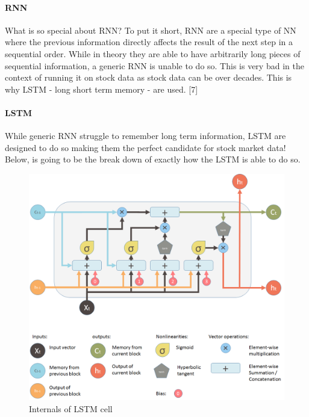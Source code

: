 \documentclass[12pt]{article}
\begin{document}
\paragraph{RNN}
What is so special about RNN? To put it short, RNN are a special type of NN where the previous information directly affects the result of the next step in a sequential order. While in theory they are able to have arbitrarily long pieces of sequential information, a generic RNN is unable to do so. This is very bad in the context of running it on stock data as stock data can be over decades. This is why LSTM - long short term memory - are used. [7] \nocite{britz_2016}

\paragraph{LSTM}
While generic RNN struggle to remember long term information, LSTM are designed to do so making them the perfect candidate for stock market data! Below, is going to be the break down of exactly how the LSTM is able to do so.

\begin{figure}[H]
  \includegraphics[width=\linewidth]{images/LSTM.png}
  \caption{Internals of LSTM cell}
\end{figure}
\end{document}

